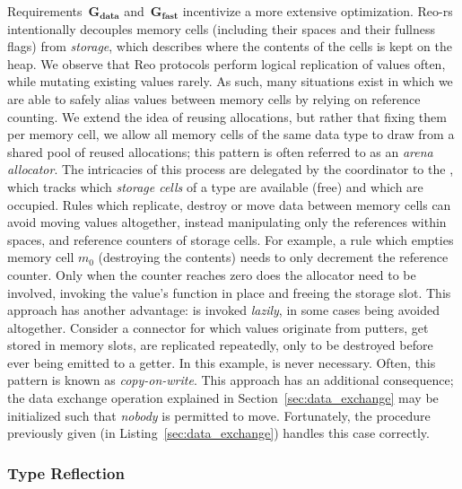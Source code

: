Requirements~$\boldsymbol{G_{data}}$ and~$\boldsymbol{G_{fast}}$ incentivize a more extensive optimization. Reo-rs intentionally decouples memory cells (including their spaces and their fullness flags) from \textit{storage}, which describes where the contents of the cells is kept on the heap. We observe that Reo protocols perform logical replication of values often, while mutating existing values rarely. As such, many situations exist in which we are able to safely alias values between memory cells by relying on reference counting. We extend the idea of reusing allocations, but rather that fixing them per memory cell, we allow all memory cells of the same data type to draw from a shared pool of reused allocations; this pattern is often referred to as an \textit{arena allocator}. The intricacies of this process are delegated by the coordinator to the , which tracks which \textit{storage cells} of a type are available (free) and which are occupied. Rules which replicate, destroy or move data between memory cells can avoid moving values altogether, instead manipulating only the references within spaces, and reference counters of storage cells. For example, a rule which empties memory cell $m_0$ (destroying the contents) needs to only decrement the reference counter. Only when the counter reaches zero does the allocator need to be involved, invoking the value's  function in place and freeing the storage slot. This approach has another advantage:  is invoked \textit{lazily}, in some cases being avoided altogether. Consider a connector for which values originate from putters, get stored in memory slots, are replicated repeatedly, only to be destroyed before ever being emitted to a getter. In this example,  is never necessary. Often, this pattern is known as \textit{copy-on-write}. This approach has an additional consequence; the data exchange operation explained in Section~\ref{sec:data_exchange} may be initialized such that \textit{nobody} is permitted to move. Fortunately, the procedure previously given (in Listing~\ref{sec:data_exchange}) handles this case correctly.

\subsubsection{Type Reflection}
\label{sec:type_reflection}

